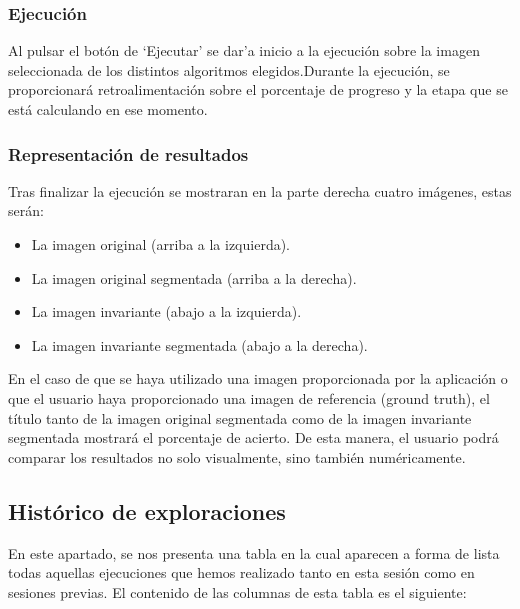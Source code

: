 \subsubsection{Ejecución}\label{ejecución}

Al pulsar el botón de `Ejecutar' se dar'a inicio a la ejecución sobre la imagen seleccionada de los distintos algoritmos elegidos.Durante la ejecución, se proporcionará retroalimentación sobre el porcentaje de progreso y la etapa que se está calculando en ese momento.

\subsubsection{Representación de resultados}\label{representación-de-resultados}

Tras finalizar la ejecución se mostraran en la parte derecha cuatro imágenes, estas serán:

\begin{itemize}
    \item La imagen original (arriba a la izquierda).
    \item La imagen original segmentada (arriba a la derecha).
    \item La imagen invariante (abajo a la izquierda).
    \item La imagen invariante segmentada (abajo a la derecha).
\end{itemize}

En el caso de que se haya utilizado una imagen proporcionada por la aplicación o que el usuario haya proporcionado una imagen de referencia (ground truth), el título tanto de la imagen original segmentada como de la imagen invariante segmentada mostrará el porcentaje de acierto. De esta manera, el usuario podrá comparar los resultados no solo visualmente, sino también numéricamente.

\subsection{Histórico de exploraciones}\label{histórico-de-exploraciones}

En este apartado, se nos presenta una tabla en la cual aparecen a forma de lista todas aquellas ejecuciones que hemos realizado tanto en esta sesión como en sesiones previas. El contenido de las columnas de esta tabla es el siguiente:

